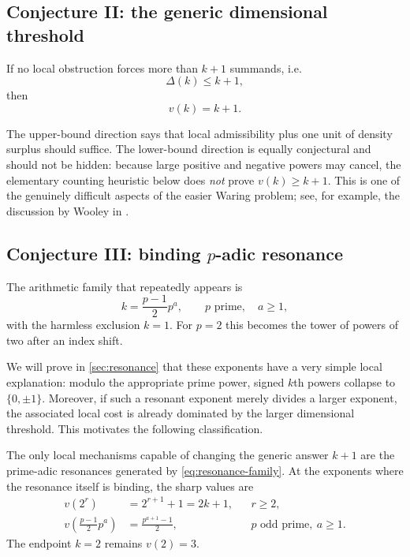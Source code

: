 \documentclass[../Axiomathic.tex]{subfiles}
\begin{document}
\subsection{Conjecture II: the generic dimensional threshold}

\begin{conj}\label{conj:generic}
If no local obstruction forces more than $k+1$ summands, i.e.
\[
  \Delta(k)\le k+1,
\]
then
\begin{equation}\label{eq:generic-v}
  \boxed{v(k)=k+1.}
\end{equation}
\end{conj}

The upper-bound direction says that local admissibility plus one unit of density surplus should suffice.  The lower-bound direction is equally conjectural and should not be hidden: because large positive and negative powers may cancel, the elementary counting heuristic below does \emph{not} prove $v(k)\ge k+1$.  This is one of the genuinely difficult aspects of the easier Waring problem; see, for example, the discussion by Wooley in \cite{BukhMO}.

\subsection{Conjecture III: binding $p$-adic resonance}

The arithmetic family that repeatedly appears is
\begin{equation}\label{eq:resonance-family}
  k=\frac{p-1}{2}p^a,
  \qquad p\text{ prime},\quad a\ge1,
\end{equation}
with the harmless exclusion $k=1$.  For $p=2$ this becomes the tower of powers of two after an index shift.

We will prove in \cref{sec:resonance} that these exponents have a very simple local explanation: modulo the appropriate prime power, signed $k$th powers collapse to $\{0,\pm1\}$.  Moreover, if such a resonant exponent merely divides a larger exponent, the associated local cost is already dominated by the larger dimensional threshold.  This motivates the following classification.

\begin{conj}\label{conj:resonance}
The only local mechanisms capable of changing the generic answer $k+1$ are the prime-adic resonances generated by \eqref{eq:resonance-family}.  At the exponents where the resonance itself is binding, the sharp values are
\begin{align}
  v(2^r)&=2^{r+1}+1=2k+1,
       &&r\ge2, \label{eq:two-formula}\\
  v\!\left(\frac{p-1}{2}p^a\right)
       &=\frac{p^{a+1}-1}{2},
       &&p\text{ odd prime},\ a\ge1. \label{eq:odd-formula}
\end{align}
The endpoint $k=2$ remains $v(2)=3$.
\end{conj}
\end{document}
